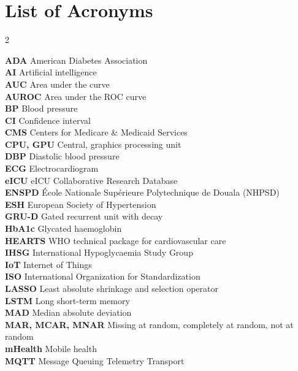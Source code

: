 \documentclass[11pt,a4paper,oneside]{report}
\begin{document}
\cleardoublepage
{}
\tableofcontents

\chapter*{List of Acronyms}
{\small
\begin{multicols}{2}\raggedright
\textbf{ADA} American Diabetes Association\\
\textbf{AI} Artificial intelligence\\
\textbf{AUC} Area under the curve\\
\textbf{AUROC} Area under the ROC curve\\
\textbf{BP} Blood pressure\\
\textbf{CI} Confidence interval\\
\textbf{CMS} Centers for Medicare \& Medicaid Services\\
\textbf{CPU, GPU} Central, graphics processing unit\\
\textbf{DBP} Diastolic blood pressure\\
\textbf{ECG} Electrocardiogram\\
\textbf{eICU} eICU Collaborative Research Database\\
\textbf{ENSPD} \'Ecole Nationale Sup\'erieure Polytechnique de Douala (NHPSD)\\
\textbf{ESH} European Society of Hypertension\\
\textbf{GRU-D} Gated recurrent unit with decay\\
\textbf{HbA1c} Glycated haemoglobin\\
\textbf{HEARTS} WHO technical package for cardiovascular care\\
\textbf{IHSG} International Hypoglycaemia Study Group\\
\textbf{IoT} Internet of Things\\
\textbf{ISO} International Organization for Standardization\\
\textbf{LASSO} Least absolute shrinkage and selection operator\\
\textbf{LSTM} Long short-term memory\\
\textbf{MAD} Median absolute deviation\\
\textbf{MAR, MCAR, MNAR} Missing at random, completely at random, not at random\\
\textbf{mHealth} Mobile health\\
\textbf{MQTT} Message Queuing Telemetry Transport\\

\end{multicols}}
\end{document}
